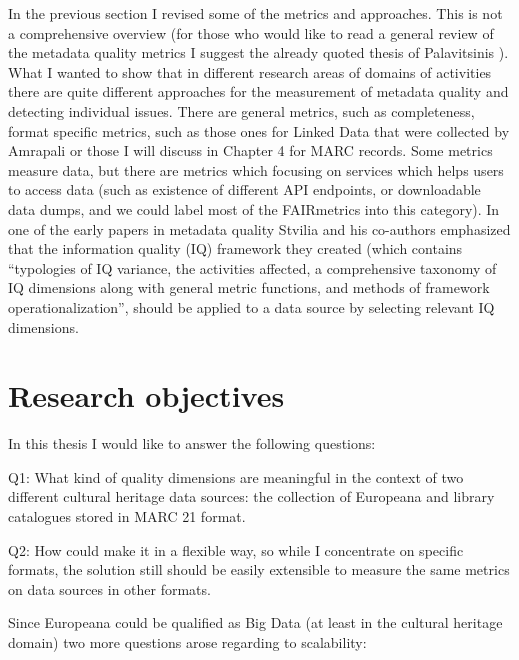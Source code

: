 In the previous section I revised some of the metrics and approaches. This is not a comprehensive overview (for those who would like to read a general review of the metadata quality metrics I suggest the already quoted thesis of Palavitsinis \cite{palavitsinis2014}). What I wanted to show that in different research areas of domains of activities there are quite different approaches for the measurement of metadata quality and detecting individual issues. There are general metrics, such as completeness, format specific metrics, such as those ones for Linked Data that were collected by Amrapali or those I will discuss in Chapter 4 for MARC records. Some metrics measure data, but there are metrics which focusing on services which helps users to access data (such as existence of different API endpoints, or downloadable data dumps, and we could label most of the FAIRmetrics into this category). In one of the early papers in metadata quality \cite{stvilia2007} Stvilia and his co-authors emphasized that the information quality (IQ) framework they created (which contains ``typologies of IQ variance, the activities affected, a comprehensive taxonomy of IQ dimensions along with general metric functions, and methods of framework operationalization'', should be applied to a data source by selecting relevant IQ dimensions.

\section{Research objectives}

In this thesis I would like to answer the following questions:

Q1: What kind of quality dimensions are meaningful in the context of two different cultural heritage data sources: the collection of Europeana and library catalogues stored in MARC 21 format. 

Q2: How could make it in a flexible way, so while I concentrate on specific formats, the solution still should be easily extensible to measure the same metrics on data sources in other formats.

Since Europeana could be qualified as Big Data (at least in the cultural heritage domain) two more questions arose regarding to scalability:

